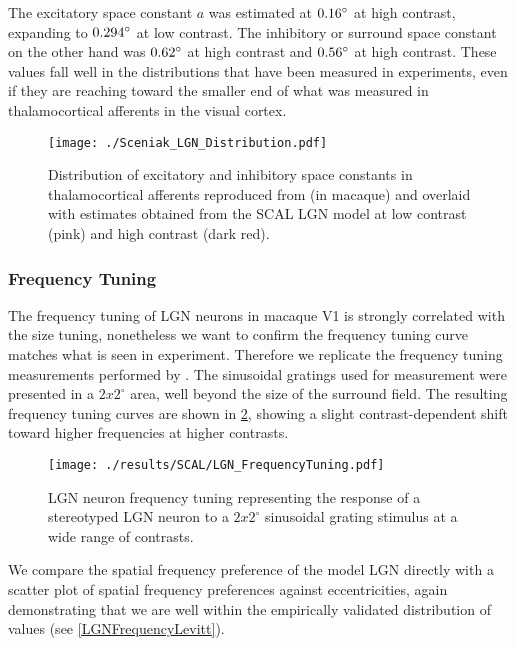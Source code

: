 The excitatory space constant $a$ was estimated at $0.16\degree$ at
high contrast, expanding to $0.294\degree$ at low contrast. The
inhibitory or surround space constant on the other hand was
$0.62\degree$ at high contrast and $0.56\degree$ at high contrast. 
These values fall well in the distributions that have been measured in
experiments, even if they are reaching toward the smaller end of what
was measured in thalamocortical afferents in the visual cortex.

\begin{figure}
	\centering   \texttt{[image: ./Sceniak\_LGN\_Distribution.pdf]}
	\caption[Distribution of excitatory and inhibitory in
      thalamocortical afferents.]{Distribution of excitatory and
      inhibitory space constants in thalamocortical afferents
      reproduced from \cite{Sceniak2006} (in macaque) and overlaid
      with estimates obtained from the SCAL LGN model at low contrast
      (pink) and high contrast (dark red).}
	\label{LGNDistribution}
\end{figure}

\subsubsection{Frequency Tuning}

The frequency tuning of LGN neurons in macaque V1 is strongly
correlated with the size tuning, nonetheless we want to confirm the
frequency tuning curve matches what is seen in experiment. Therefore
we replicate the frequency tuning measurements performed by
\cite{Levitt2001}. The sinusoidal gratings used for measurement were
presented in a $2x2^{\circ}$ area, well beyond the size of the
surround field. The resulting frequency tuning curves are shown in
\ref{LGNFrequencyTuning}, showing a slight contrast-dependent shift
toward higher frequencies at higher contrasts.

\begin{figure}
	\centering
    \texttt{[image: ./results/SCAL/LGN\_FrequencyTuning.pdf]}
	\caption{LGN neuron frequency tuning representing the response of
      a stereotyped LGN neuron to a $2x2^{\circ}$ sinusoidal grating
      stimulus at a wide range of contrasts.}
	\label{LGNFrequencyTuning}
\end{figure}

We compare the spatial frequency preference of the model LGN directly
with a scatter plot of spatial frequency preferences against
eccentricities, again demonstrating that we are well within the
empirically validated distribution of values (see
\ref{LGNFrequencyLevitt}).

